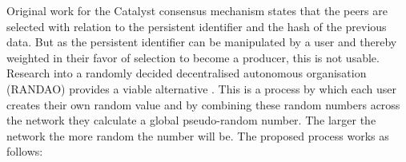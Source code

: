 Original work for the Catalyst consensus mechanism states that the peers are selected with relation to the persistent identifier and the hash of the previous data. But as the persistent identifier can be manipulated by a user and thereby weighted in their favor of selection to become a producer, this is not usable. \\

Research into a randomly decided decentralised autonomous organisation (RANDAO) provides a viable alternative \cite{skvorc}\cite{randao}. This is a process by which each user creates their own random value and by combining these random numbers across the network they calculate a global pseudo-random number. The larger the network the more random the number will be. The proposed process works as follows: \\

